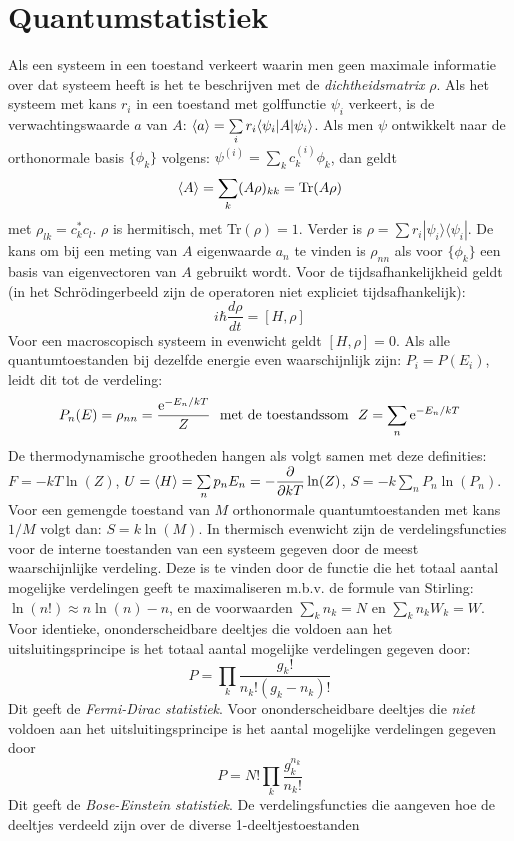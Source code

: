 \documentclass[twoside]{report}
\begin{document}
\section[~~Quantumstatistiek]{Quantumstatistiek}
Als een systeem in een toestand verkeert waarin men geen maximale informatie
over dat systeem heeft is het te beschrijven met de {\it dichtheidsmatrix}
$\rho$. Als het systeem met kans $r_i$ in een toestand met golffunctie
$\psi_i$ verkeert, is de verwachtingswaarde $a$ van $A$:
$\left\langle a \right\rangle=\sum\limits_ir_i\langle\psi_i|A|\psi_i\rangle$.
\npar
Als men $\psi$ ontwikkelt naar de orthonormale basis $\{\phi_k\}$ volgens:
$\psi^{(i)}=\sum\limits_k c_k^{(i)}\phi_k$, dan geldt
\[
\left\langle A \right\rangle=\sum_k(A\rho)_{kk}={\rm Tr}(A\rho)
\]
met $\rho_{lk}=c_k^*c_l$. $\rho$ is hermitisch, met Tr$(\rho)=1$. Verder is
$\rho=\sum r_i|\psi_i\rangle\langle\psi_i|$. De kans om bij een meting van
$A$ eigenwaarde $a_n$ te vinden is $\rho_{nn}$ als voor $\{\phi_k\}$ een
basis van eigenvectoren van $A$ gebruikt wordt. Voor de tijdsafhankelijkheid
geldt (in het Schr\"odingerbeeld zijn de operatoren niet expliciet
tijdsafhankelijk):
\[
i\hbar\frac{d\rho}{dt}=[H,\rho]
\]
Voor een macroscopisch systeem in evenwicht geldt $[H,\rho]=0$. Als alle
quantumtoestanden bij dezelfde energie even waarschijnlijk zijn:
$P_i=P(E_i)$, leidt dit tot de verdeling:
\[
P_n(E)=\rho_{nn}=\frac{{\rm e}^{-E_n/kT}}{Z}~~\mbox{met de toestandssom}~~
Z=\sum_n{\rm e}^{-E_n/kT}
\]
De thermodynamische grootheden hangen als volgt samen met deze definities:
$F=-kT\ln(Z)$, $U=\left\langle H \right\rangle=\sum\limits_np_nE_n=\displaystyle-\frac{\partial }{\partial kT}\ln(Z)$,
$S=-k\sum\limits_nP_n\ln(P_n)$. Voor een gemengde toestand van $M$
orthonormale quantumtoestanden met kans $1/M$ volgt dan: $S=k\ln(M)$.
\npar
In thermisch evenwicht zijn de verdelingsfuncties voor de interne toestanden
van een systeem gegeven door de meest waarschijnlijke verdeling. Deze is te
vinden door de functie die het totaal aantal mogelijke verdelingen geeft te
maximaliseren m.b.v. de formule van Stirling: $\ln(n!)\approx n\ln(n)-n$,
en de voorwaarden $\sum\limits_kn_k=N$ en $\sum\limits_kn_kW_k=W$.
Voor identieke, ononderscheidbare deeltjes die voldoen aan het
uitsluitingsprincipe is het totaal aantal mogelijke verdelingen gegeven door:
\[
P=\prod_k\frac{g_k!}{n_k!(g_k-n_k)!}
\]
Dit geeft de {\it Fermi-Dirac statistiek}. Voor ononderscheidbare deeltjes
die {\it niet} voldoen aan het uitsluitingsprincipe is het aantal mogelijke
verdelingen gegeven door
\[
P=N!\prod_k\frac{g_k^{n_k}}{n_k!}
\]
Dit geeft de {\it Bose-Einstein statistiek}. De verdelingsfuncties die
aangeven hoe de deeltjes verdeeld zijn over de diverse 1-deeltjestoestanden
\end{document}
